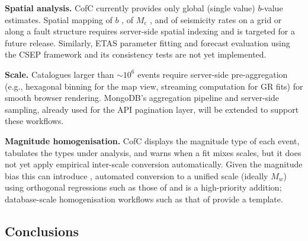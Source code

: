 \documentclass[12pt]{article}
\begin{document}
\textbf{Spatial analysis.}  CofC currently provides only global (single
value) $b$-value estimates.  Spatial mapping of $b$ \citep{wiemer2000,
schorlemmer2005}, of $M_c$ \citep{schorlemmer2008}, and of seismicity rates on a grid or along a fault
structure requires server-side spatial indexing and is targeted for a future
release.  Similarly, ETAS parameter fitting \citep{ogata1988} and
forecast evaluation using the CSEP framework and its consistency tests
\citep{schorlemmer2007,zechar2010} are
not yet implemented.

\textbf{Scale.}  Catalogues larger than $\sim 10^6$ events require
server-side pre-aggregation (e.g., hexagonal binning for the map view,
streaming computation for GR fits) for smooth browser rendering.  Mongo\-DB's
aggregation pipeline and server-side sampling, already used for the API
pagination layer, will be extended to support these workflows.

\textbf{Magnitude homogenisation.}  CofC displays the magnitude type of
each event, tabulates the types under analysis, and warns when a fit mixes
scales, but it does not yet apply empirical inter-scale conversion
automatically.  Given the magnitude
bias this can introduce \citep{marzocchi2003, tinti1987}, automated
conversion to a unified scale (ideally $M_w$) using orthogonal regressions
such as those of \citet{das2011} and \citet{lolli2012} is a high-priority
addition; database-scale homogenisation workflows such as that of
\citet{weatherill2016} provide a template.

\subsection{Conclusions}
\end{document}
